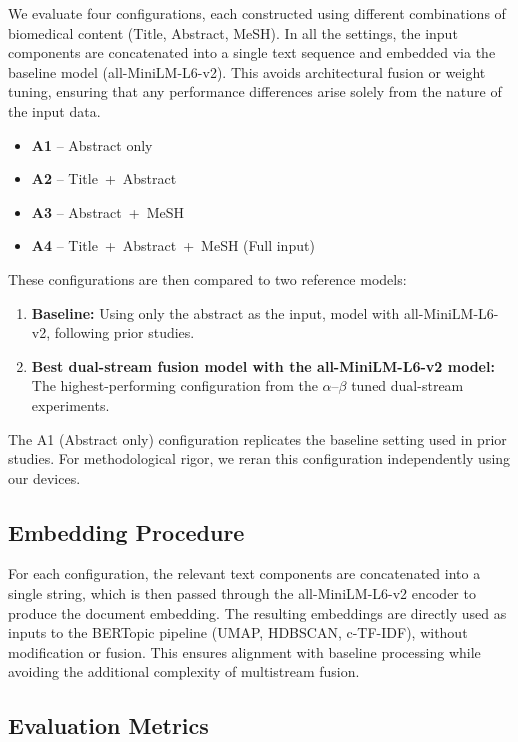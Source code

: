 \documentclass[authorproof,JACIII,researchpaper]{fujipressarticle}
\begin{document}
We evaluate four configurations, each constructed using different combinations of biomedical content (Title, Abstract, MeSH). In all the settings, the input components are concatenated into a single text sequence and embedded via the baseline model (all-MiniLM-L6-v2). This avoids architectural fusion or weight tuning, ensuring that any performance differences arise solely from the nature of the input data.

\begin{itemize}[leftmargin=*]
    \item \textbf{A1} -- Abstract only
    \item \textbf{A2} -- Title~+~Abstract
    \item \textbf{A3} -- Abstract~+~MeSH
    \item \textbf{A4} -- Title~+~Abstract~+~MeSH (Full input)
\end{itemize}

These configurations are then compared to two reference models:
\begin{enumerate}[leftmargin=*,label=\arabic*)]
    \item \textbf{Baseline:} Using only the abstract as the input, model with all-MiniLM-L6-v2, following prior studies.
    \item \textbf{Best dual-stream fusion model with the all-MiniLM-L6-v2 model:} The highest-performing configuration from the $\alpha$--$\beta$ tuned dual-stream experiments.
\end{enumerate}

The A1 (Abstract only) configuration replicates the baseline setting used in prior studies. For methodological rigor, we reran this configuration independently using our devices.

\subsection{Embedding Procedure}

For each configuration, the relevant text components are concatenated into a single string, which is then passed through the all-MiniLM-L6-v2 encoder to produce the document embedding. The resulting embeddings are directly used as inputs to the BERTopic pipeline (UMAP, HDBSCAN, c-TF-IDF), without modification or fusion. This ensures alignment with baseline processing while avoiding the additional complexity of multistream fusion.

\subsection{Evaluation Metrics}
\end{document}
